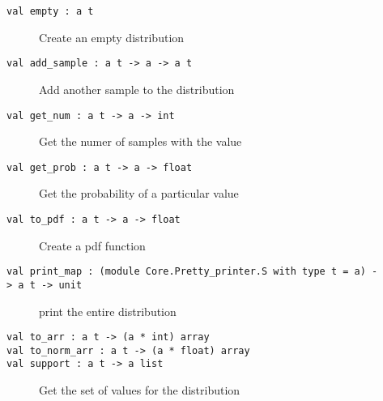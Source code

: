 \begin{description}
\item[{\protect\hyperlink{val-empty}{}\texttt{val\ empty\ :\ \textquotesingle{}a\ t}}]
Create an empty distribution
\end{description}

\begin{description}
\item[{\protect\hyperlink{val-addux5fsample}{}\texttt{val\ add\_sample\ :\ \textquotesingle{}a\ t\ -\textgreater{}\ \textquotesingle{}a\ -\textgreater{}\ \textquotesingle{}a\ t}}]
Add another sample to the distribution
\end{description}

\begin{description}
\item[{\protect\hyperlink{val-getux5fnum}{}\texttt{val\ get\_num\ :\ \textquotesingle{}a\ t\ -\textgreater{}\ \textquotesingle{}a\ -\textgreater{}\ int}}]
Get the numer of samples with the value
\end{description}

\begin{description}
\item[{\protect\hyperlink{val-getux5fprob}{}\texttt{val\ get\_prob\ :\ \textquotesingle{}a\ t\ -\textgreater{}\ \textquotesingle{}a\ -\textgreater{}\ float}}]
Get the probability of a particular value
\end{description}

\begin{description}
\item[{\protect\hyperlink{val-toux5fpdf}{}\texttt{val\ to\_pdf\ :\ \textquotesingle{}a\ t\ -\textgreater{}\ \textquotesingle{}a\ -\textgreater{}\ float}}]
Create a pdf function
\end{description}

\begin{description}
\item[{\protect\hyperlink{val-printux5fmap}{}\texttt{val\ print\_map\ :\ (module\ Core.Pretty\_printer.S\ with\ type\ t\ =\ \textquotesingle{}a)\ -\textgreater{}\ \textquotesingle{}a\ t\ -\textgreater{}\ unit}}]
print the entire distribution
\end{description}

\begin{description}
\item[{\protect\hyperlink{val-toux5farr}{}\texttt{val\ to\_arr\ :\ \textquotesingle{}a\ t\ -\textgreater{}\ (\textquotesingle{}a\ *\ int)\ array}\\
\protect\hyperlink{val-toux5fnormux5farr}{}\texttt{val\ to\_norm\_arr\ :\ \textquotesingle{}a\ t\ -\textgreater{}\ (\textquotesingle{}a\ *\ float)\ array}\\
\protect\hyperlink{val-support}{}\texttt{val\ support\ :\ \textquotesingle{}a\ t\ -\textgreater{}\ \textquotesingle{}a\ list}}]
Get the set of values for the distribution
\end{description}
